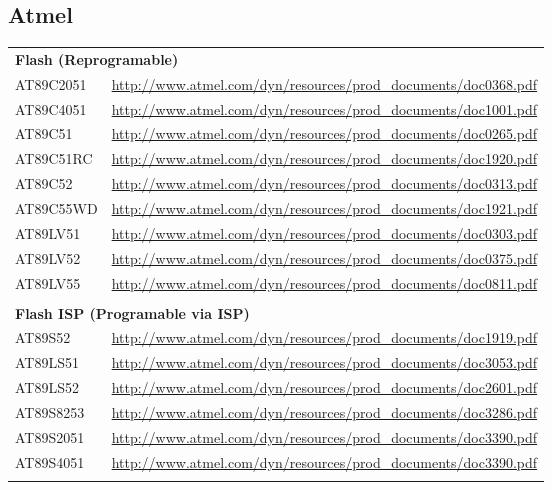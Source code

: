 \documentclass[a4paper,twoside,12pt]{book}
\newcommand{\mysmallfont}{\fontsize{8pt}{10pt} \selectfont{}}
\begin{document}
	\subsection{Atmel\textregistered}
		{
		\mysmallfont{}
		\begin{longtable}{ll}
			\multicolumn{2}{l}{\textbf{\small{}Flash (Reprogramable)}}						\\
			AT89C2051		& \url{http://www.atmel.com/dyn/resources/prod\_documents/doc0368.pdf}		\\
			AT89C4051		& \url{http://www.atmel.com/dyn/resources/prod\_documents/doc1001.pdf}		\\
			AT89C51			& \url{http://www.atmel.com/dyn/resources/prod\_documents/doc0265.pdf}		\\
			AT89C51RC		& \url{http://www.atmel.com/dyn/resources/prod\_documents/doc1920.pdf}		\\
			AT89C52			& \url{http://www.atmel.com/dyn/resources/prod\_documents/doc0313.pdf}		\\
			AT89C55WD		& \url{http://www.atmel.com/dyn/resources/prod\_documents/doc1921.pdf}		\\
			AT89LV51		& \url{http://www.atmel.com/dyn/resources/prod\_documents/doc0303.pdf}		\\
			AT89LV52		& \url{http://www.atmel.com/dyn/resources/prod\_documents/doc0375.pdf}		\\
			AT89LV55		& \url{http://www.atmel.com/dyn/resources/prod\_documents/doc0811.pdf}		\\\\

			\multicolumn{2}{l}{\textbf{\small{}Flash ISP (Programable via ISP)}}					\\
			AT89S52			& \url{http://www.atmel.com/dyn/resources/prod\_documents/doc1919.pdf}		\\
			AT89LS51		& \url{http://www.atmel.com/dyn/resources/prod\_documents/doc3053.pdf}		\\
			AT89LS52		& \url{http://www.atmel.com/dyn/resources/prod\_documents/doc2601.pdf}		\\
			AT89S8253		& \url{http://www.atmel.com/dyn/resources/prod\_documents/doc3286.pdf}		\\
			AT89S2051		& \url{http://www.atmel.com/dyn/resources/prod\_documents/doc3390.pdf}		\\
			AT89S4051		& \url{http://www.atmel.com/dyn/resources/prod\_documents/doc3390.pdf}		\\\\


\end{longtable}}
\end{document}

